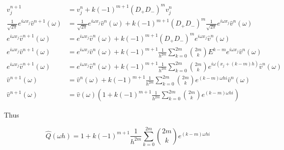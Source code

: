 \documentclass[11pt]{amsart}
\numberwithin{equation}{section}
\begin{document}
\begin{enumerate}[a)]
{          \begin{align}
              v_j^{n+1}                                                  & = v_j^n + k (-1)^{m+1} (D_+ D_-)^m v_j^n                                                                                                                                                 \\
              \frac{1}{\sqrt{2\pi}} e^{i\omega x_j} \hat v^{n+1}(\omega) & = \frac{1}{\sqrt{2\pi}} e^{i\omega x_j} \hat v^n(\omega) + k (-1)^{m+1} (D_+ D_-)^m \frac{1}{\sqrt{2\pi}} e^{i\omega x_j} \hat v^n(\omega)                                               \\
              e^{i\omega x_j} \hat v^{n+1}(\omega)                       & = e^{i\omega x_j} \hat v^n(\omega) + k (-1)^{m+1} (D_+ D_-)^m e^{i\omega x_j} \hat v^n(\omega)                                                                                           \\
              e^{i\omega x_j} \hat v^{n+1}(\omega)                       & = e^{i\omega x_j} \hat v^n(\omega) + k (-1)^{m+1} \frac{1}{h^{2m}} \sum_{k=0}^{2m} \binom{2m}{k} E^{k-m} e^{i\omega x_j} \hat v^n(\omega)                                                \\                                           
              e^{i\omega x_j} \hat v^{n+1}(\omega)                       & = e^{i\omega x_j} \hat v^n(\omega) + k (-1)^{m+1} \frac{1}{h^{2m}} \sum_{k=0}^{2m} \binom{2m}{k} e^{i\omega (x_j + (k-m)h)} \hat v^n(\omega)                                             \\                                           
              \hat v^{n+1}(\omega)                                       & = \hat v^n(\omega) + k (-1)^{m+1} \frac{1}{h^{2m}} \sum_{k=0}^{2m} \binom{2m}{k} e^{(k-m)\omega hi} \hat v^n(\omega)                                                                     \\                                       
              \hat v^{n+1}(\omega)                                       & = \hat v(\omega)\left(1 + k (-1)^{m+1} \frac{1}{h^{2m}} \sum_{k=0}^{2m} \binom{2m}{k} e^{(k-m)\omega hi}\right)                                                                         
          \end{align}
          
          Thus
          
          \begin{equation}
              \hat Q(\omega h) = 1 + k (-1)^{m+1} \frac{1}{h^{2m}} \sum_{k=0}^{2m} \binom{2m}{k} e^{(k-m)\omega hi}
          \end{equation}
          }
          

\end{enumerate}
\end{document}
